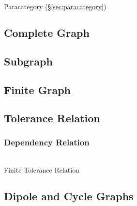 Paracategory (\S\ref{sec:paracategory})



\subsection{Complete Graph} \label{sec:complete_graph}

\subsection{Subgraph} \label{sec:subgraphs}

\subsection{Finite Graph} \label{sec:finite_graph}

\subsection{Tolerance Relation}\label{sec:tolerance_relation}

\subsubsection{Dependency Relation}\label{sec:dependency_relation}
\hfill \\

Finite Tolerance Relation



\subsection{Dipole and Cycle Graphs} \label{sec:dipole_cycle_graph}

